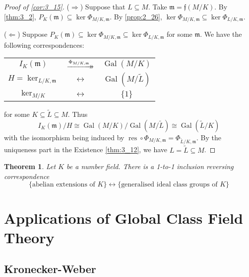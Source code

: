 \documentclass[11pt]{article}
\theoremstyle{definition}
\theoremstyle{plain}
\newtheorem{theorem}[definition]{Theorem}
\theoremstyle{remark}
\DeclareMathOperator{\Gal}{Gal}
\DeclareMathOperator{\res}{res}
\newcommand{\xrightarrowdbl}[2][]{%
  \xrightarrow[#1]{#2}\mathrel{\mkern-14mu}\rightarrow
}
\newcommand{\ff}{\mathfrak{f}}
\newcommand{\fm}{\mathfrak{m}}
\begin{document}
\begin{proof}[Proof of \autoref{cor:3_15}]\phantom{}

    ($\Rightarrow$) Suppose that $L \subseteq M$. Take $\fm = \ff(M/K)$. By \autoref{thm:3_2}, $P_K(\fm) \subseteq \ker \Phi_{M/K,\fm}$. By \autoref{prop:2_26}, $\ker\Phi_{M/K, \fm} \subseteq \ker \Phi_{L/K, \fm}$.

    ($\Leftarrow$) Suppose $P_K(\fm) \subseteq \ker \Phi_{M/K, \fm} \subseteq \ker \Phi_{L/K, \fm}$ for some $\fm$. We have the following correspondences:
    \begin{center}
    \begin{tabular}{ccc}
        $I_K(\fm)$ & $\xrightarrowdbl{\Phi_{M/K, \fm}}$ & $\Gal(M/K)$\\
        $H = \ker_{L/K, \fm}$ & $\longleftrightarrow$ & $\Gal(M/\widetilde{L})$\\
        $\ker_{M/K}$ & $\longleftrightarrow$ & $\{1\}$
    \end{tabular}
    \end{center}
    for some $K \subseteq \widetilde{L} \subseteq M$. Thus
    \begin{equation*}
        I_K(\fm) / H \cong \Gal(M/K) / \Gal(M/\widetilde{L}) \cong \Gal(\widetilde{L}/K)
    \end{equation*}
    with the isomorphism being induced by $\res \circ \Phi_{M/K, \fm} = \Phi_{\widetilde{L}/K, \fm}$. By the uniqueness part in the Existence \autoref{thm:3_12}, we have $L = \widetilde{L} \subseteq M$.
\end{proof}

\begin{theorem}\label{thm:3_17}
    Let $K$ be a number field. There is a 1-to-1 inclusion reversing correspondence
    \begin{equation*}
        \{\text{abelian extensions of } K\} \longleftrightarrow \{\text{generalised ideal class groups of } K\}
    \end{equation*}
\end{theorem}

\section{Applications of Global Class Field Theory}

\subsection{Kronecker-Weber}
\end{document}

